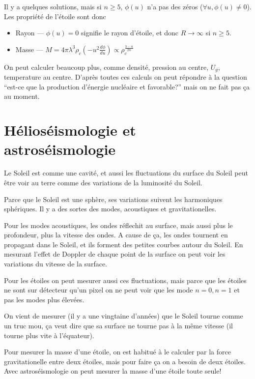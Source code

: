 \documentclass[10pt]{report}
\newcommand{\rd}[2]{\frac{d#1}{d#2}}
\begin{document}
Il y a quelques solutions, mais si $n \geq 5$, $\phi(u)$ n'a pas des z\'eros ($\forall u, \phi(u) \neq 0$). Les propri\'et\'e de l'\'etoile sont donc
\begin{itemize}
    \item Rayon --- $\phi(u) = 0$ signifie le rayon d'\'etoile, et donc $R \to \infty$ si $n \geq 5$.
    \item Masse --- $M = 4\pi \lambda^3 \rho_c \left( -u^2 \rd{\phi}{u} \right) \propto \rho_c^{\frac{3-n}{2n}}$
\end{itemize}

On peut calculer beaucoup plus, comme densit\'e, pression au centre, $U_{g}$, temperature au centre. D'apr\`es toutes ces calculs on peut r\'epondre \`a la question ``est-ce que la production d'\'energie nucl\'eaire et favorable?'' mais on ne fait pas \c{c}a au moment.

\section{H\'elios\'eismologie et astros\'eismologie}

Le Soleil est comme une cavit\'e, et aussi les fluctuations du surface du Soleil peut \^etre voir au terre comme des variations de la luminosit\'e du Soleil. 

Parce que le Soleil est une sph\`ere, ses variations suivent les harmoniques sph\'eriques. Il y a des sortes des modes, acoustiques et gravitationelles.

Pour les modes acoustiques, les ondes r\'eflechit au surface, mais aussi plus le profondeur, plus la vitesse des ondes. A cause de \c{c}a, les ondes tournent en propagant dans le Soleil, et ils forment des petites courbes autour du Soleil. En mesurant l'effet de Doppler de chaque point de la surface on peut voir les variations du vitesse de la surface. 

Pour les \'etoiles on peut mesurer aussi ces fluctuations, mais parce que les \'etoiles ne sont sur d\'etecteur qu'un pixel on ne peut voir que les mode $n=0,n=1$ et pas les modes plus \'elev\'ees.

On vient de mesurer (il y a une vingtaine d'ann\'ees) que le Soleil tourne comme un truc mou, \c{c}a veut dire que sa surface ne tourne pas \`a la m\^eme vitesse (il tourne plus vite \`a l'\'equateur).

Pour mesurer la masse d'une \'etoile, on est habitu\'e \`a le calculer par la force gravitationelle entre deux \'etoiles, mais pour faire \c{c}a on a besoin de deux \'etoiles. Avec astros\'eismologie on peut mesurer la masse d'une \'etoile toute seule!
\end{document}
